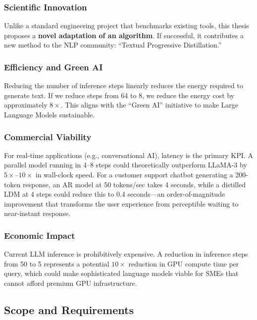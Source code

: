 \documentclass[11pt, a4paper]{article}
\begin{document}
\subsubsection*{Scientific Innovation}
Unlike a standard engineering project that benchmarks existing tools, this thesis proposes a \textbf{novel adaptation of an algorithm}. If successful, it contributes a new method to the NLP community: ``Textual Progressive Distillation.''

\subsubsection*{Efficiency and Green AI}
Reducing the number of inference steps linearly reduces the energy required to generate text. If we reduce steps from 64 to 8, we reduce the energy cost by approximately $8\times$. This aligns with the ``Green AI'' initiative \cite{strubell2019energy} to make Large Language Models sustainable.

\subsubsection*{Commercial Viability}
For real-time applications (e.g., conversational AI), latency is the primary KPI. A parallel model running in 4--8 steps could theoretically outperform LLaMA-3 by $5\times$--$10\times$ in wall-clock speed. For a customer support chatbot generating a 200-token response, an AR model at 50 tokens/sec takes 4 seconds, while a distilled LDM at 4 steps could reduce this to 0.4 seconds---an order-of-magnitude improvement that transforms the user experience from perceptible waiting to near-instant response.

\subsubsection*{Economic Impact}
Current LLM inference is prohibitively expensive. A reduction in inference steps from 50 to 5 represents a potential $10\times$ reduction in GPU compute time per query, which could make sophisticated language models viable for SMEs that cannot afford premium GPU infrastructure.

\subsection*{Scope and Requirements}
\label{subsec:scope_requirements}
\end{document}
